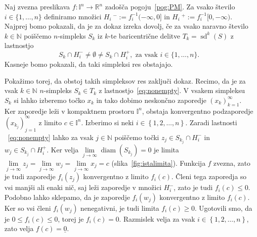 \documentclass[mat1]{fmfdelo}
\newcommand{\R}{\mathbb R}
\newcommand{\N}{\mathbb N}
\DeclareMathOperator{\diam}{diam}
\DeclareMathOperator{\sd}{sd}
\newcommand{\I}{\mathbb I}
\newcommand{\0}{\underline{0}}
\begin{document}
\begin{dokaz}
Naj zvezna preslikava $f : \I^n \to  \R^n$ zadošča pogoju~\eqref{pog:PM}. Za vsako število $i \in \{ 1, \dots, n\}$ definiramo množici $H_i\ ^- := f_i^{-1} (-\infty, 0]$ in $H_i\ ^+ := f_i^{-1} [0, -\infty)$. Najprej bomo pokazali, da je za dokaz izreka dovolj, če za vsako naravno število $k \in \N$ poiščemo $n$-simpleks $S_k$ iz $k$-te baricentrične delitve $T_k = \sd^k(S)$ z lastnostjo 
\begin{equation}\label{eq:nonempty}
S_k \cap H_i^- \neq \emptyset \neq S_k \cap H_i^+, \text{ za vsak } i \in \{ 1, \dots, n \}.
\end{equation}
Kasneje bomo pokazali, da taki simpleksi res obstajajo.

Pokažimo torej, da obstoj takih simpleksov res zaključi dokaz. Recimo, da je za vsak $k \in \N$ $n$-simpleks $S_k \in T_k$ z lastnostjo~\eqref{eq:nonempty}. V vsakem simpleksu $S_k$ si lahko izberemo točko $x_k$ in tako dobimo neskončno zaporedje $\left ( x_k \right ) _{k = 1}^{\infty}$. Ker zaporedje leži v kompaktnem prostoru $\I^n$, obstaja konvergentno podzaporedje $\left ( x_{k_j} \right ) _{j = 1}^{\infty}$ z limito $c \in \I^n$. Izberimo si neki $i \in \left \{1, 2, \dots, n\right \}$. Zaradi lastnosti ~\eqref{eq:nonempty} lahko za vsak $j \in \N$ poiščemo točki $z_j \in S_{k_j} \cap H_i^-$ in $w_j \in S_{k_j} \cap H_i^+$. Ker velja $\lim\limits_{j \to \infty} \diam(S_{k_j}) = 0$ je limita  $\lim\limits_{j \to \infty} z_j = \lim\limits_{j \to \infty} w_j = \lim\limits_{j \to \infty} x_j = c$ (slika~\ref{fig:istalimita}). Funkcija $f$ zvezna, zato je tudi zaporedje $f_i(z_j)$ konvergentno z limito $f_i(c)$. Členi tega zaporedja so vsi manjši ali enaki nič, saj leži zaporedje v množici $H_i^-$, zato je tudi $f_i(c) \leq 0$. Podobno lahko sklepamo, da je zaporedje $f_i(w_j)$ konvergentno z limito $f_i(c)$. Ker so vsi členi $f_i(w_j)$ nenegativni, je tudi limita $f_i(c) \geq 0$. Ugotovili smo, da je $0 \leq f_i(c) \leq 0$, torej je $f_i(c) = 0$. Razmislek velja za vsak $i \in \left \{1, 2, \dots, n\right \}$, zato velja $f(c) = \0$.

\begin{figure}[h!]
	\centering
\end{figure}
\end{dokaz}
\end{document}
